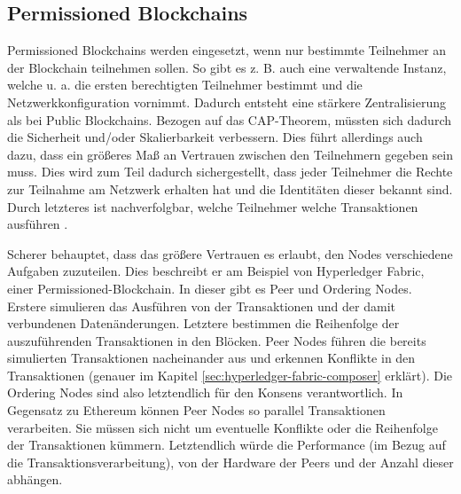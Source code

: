 \subsection{Permissioned Blockchains}
Permissioned Blockchains werden eingesetzt, wenn nur bestimmte Teilnehmer an der Blockchain teilnehmen sollen. So gibt es z. B. auch eine verwaltende Instanz, welche u. a. die ersten berechtigten Teilnehmer bestimmt und die Netzwerkkonfiguration vornimmt. Dadurch entsteht eine stärkere Zentralisierung als bei Public Blockchains. Bezogen auf das CAP-Theorem, müssten sich dadurch die Sicherheit und/oder Skalierbarkeit verbessern. Dies führt allerdings auch dazu, dass ein größeres Maß an Vertrauen zwischen den Teilnehmern gegeben sein muss. Dies wird zum Teil dadurch sichergestellt, dass jeder Teilnehmer die Rechte zur Teilnahme am Netzwerk erhalten hat und die Identitäten dieser bekannt sind. Durch letzteres ist nachverfolgbar, welche Teilnehmer welche Transaktionen ausführen \cite{SchererPerformanceScalabilityBlockchain2017}.

Scherer behauptet, dass das größere Vertrauen es erlaubt, den Nodes verschiedene Aufgaben zuzuteilen. Dies beschreibt er am Beispiel von Hyperledger Fabric, einer Permissioned-Blockchain. In dieser gibt es Peer und Ordering Nodes. Erstere simulieren das Ausführen von der Transaktionen und der damit verbundenen Datenänderungen. Letztere bestimmen die Reihenfolge der auszuführenden Transaktionen in den Blöcken. Peer Nodes führen die bereits simulierten Transaktionen nacheinander aus und erkennen Konflikte in den Transaktionen (genauer im Kapitel \ref{sec:hyperledger-fabric-composer} erklärt). Die Ordering Nodes sind also letztendlich für den Konsens verantwortlich. In Gegensatz zu Ethereum können Peer Nodes so parallel Transaktionen verarbeiten. Sie müssen sich nicht um eventuelle Konflikte oder die Reihenfolge der Transaktionen kümmern. Letztendlich würde die Performance (im Bezug auf die Transaktionsverarbeitung), von der Hardware der Peers und der Anzahl dieser abhängen.


